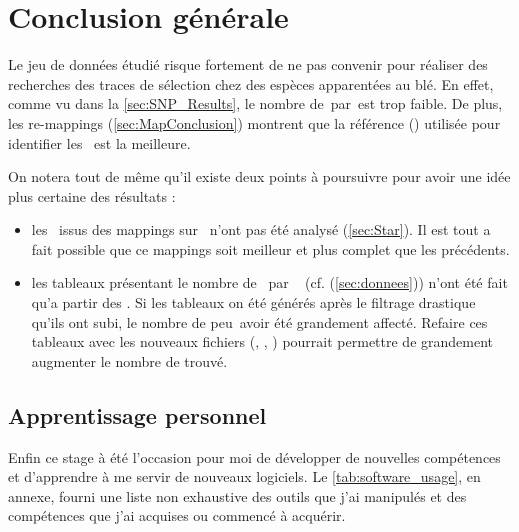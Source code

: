 \documentclass[../main]{subfiles} %
\begin{document}
\addto\extrasfrench{\protected\edef:{\unexpanded\expandafter{:}}}

\section{Conclusion générale}

Le jeu de données étudié risque fortement de ne pas convenir pour réaliser des recherches des traces de sélection chez des espèces apparentées au blé. En effet, comme vu dans la \cref{sec:SNP_Results}, le nombre de \SNP\,par \contigs\,est trop faible. De plus, les re-\glspl{mapping} (\cref{sec:MapConclusion}) montrent que la référence (\TrEx) utilisée pour identifier les  \SNP est la meilleure. 

On notera tout de même qu'il existe deux points à poursuivre pour avoir une idée plus certaine des résultats :

\begin{itemize}
    \item les \bam issus des \glspl{mapping} sur \GeMo n'ont pas été analysé (\cref{sec:Star}). Il est tout a fait possible que ce \glspl{mapping} soit meilleur et plus complet que les précédents.

    \item les tableaux présentant le nombre de \SNP par \contigs  (cf. (\cref{sec:donnees})) n'ont été fait qu'a partir des \OldBam. Si les tableaux on été générés après le filtrage drastique qu'ils ont subi, le nombre de \SNP peu avoir été grandement affecté. Refaire ces tableaux avec les nouveaux fichiers (\BamGeStar, \BamTrEx, \BamTrMo) pourrait permettre de grandement augmenter le nombre de \SNP trouvé.
\end{itemize}

\subsection{Apprentissage personnel}
Enfin ce stage à été l'occasion pour moi de développer de nouvelles compétences et d'apprendre à me servir de nouveaux logiciels. Le \cref{tab:software_usage}, en annexe, fourni une liste non exhaustive des outils que j'ai manipulés et des compétences que j'ai acquises ou commencé à acquérir.






\end{document}
